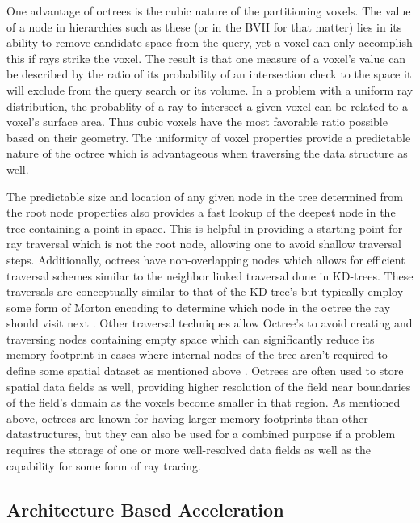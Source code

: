 \documentclass[12pt, a4paper]{article}
\begin{document}
One advantage of octrees is the cubic nature of the partitioning voxels. The value of a node in hierarchies such as these (or in the BVH for that matter) lies in its ability to remove candidate space from the query, yet a voxel can only accomplish this if rays strike the voxel. The result is that one measure of a voxel's value can be described by the ratio of its probability of an intersection check to the space it will exclude from the query search or its volume. In a problem with a uniform ray distribution, the probablity of a ray to intersect a given voxel can be related to a voxel's surface area. Thus cubic voxels have the most favorable ratio possible based on their geometry. The uniformity of voxel properties provide a predictable nature of the octree which is advantageous when traversing the data structure as well. 

The predictable size and location of any given node in the tree determined from the root node properties also provides a fast lookup of the deepest node in the tree containing a point in space. This is helpful in providing a starting point for ray traversal which is not the root node, allowing one to avoid shallow traversal steps. Additionally, octrees have non-overlapping nodes which allows for efficient traversal schemes similar to the neighbor linked traversal done in KD-trees. These traversals are conceptually similar to that of the KD-tree's but typically employ some form of Morton encoding to determine which node in the octree the ray should visit next \cite{Revelles_2000}. Other traversal techniques allow Octree's to avoid creating and traversing nodes containing empty space which can significantly reduce its memory footprint in cases where internal nodes of the tree aren't required to define some spatial dataset as mentioned above \cite{Samet_1989}. Octrees are often used to store spatial data fields as well, providing higher resolution of the field near boundaries of the field's domain as the voxels become smaller in that region. As mentioned above, octrees are known for having larger memory footprints than other datastructures, but they can also be used for a combined purpose if a problem requires the storage of one or more well-resolved data fields as well as the capability for some form of ray tracing.


\subsection{Architecture Based Acceleration}%
\end{document}
